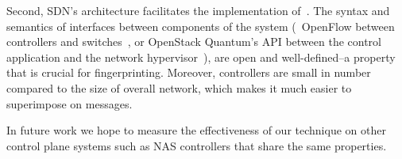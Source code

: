 Second, SDN's architecture facilitates the implementation of~\projectname. The
syntax and semantics of interfaces between components of the system
(\eg~OpenFlow between controllers and switches~\cite{openflow}, or OpenStack
Quantum's API between the control application and the network
hypervisor~\cite{quantum}), are open and well-defined--a property that is
crucial for fingerprinting. Moreover, controllers are small in number compared
to the size of overall network, which makes it much easier to superimpose on
messages.

In future work we hope to measure the effectiveness of our
technique on other control plane systems such as NAS controllers
that share the same properties.


